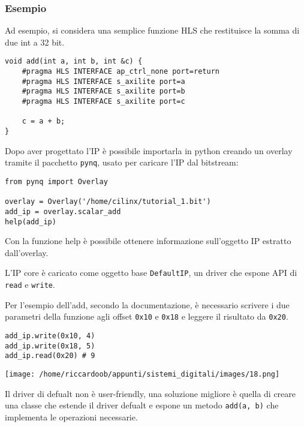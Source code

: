 \subsubsection{Esempio}
Ad esempio, si considera una semplice funzione HLS che restituisce la somma di due int a 32 bit.
\begin{verbatim}
void add(int a, int b, int &c) {
    #pragma HLS INTERFACE ap_ctrl_none port=return
    #pragma HLS INTERFACE s_axilite port=a
    #pragma HLS INTERFACE s_axilite port=b
    #pragma HLS INTERFACE s_axilite port=c

    c = a + b;
}
\end{verbatim}
Dopo aver progettato l'IP è possibile importarla in python creando un overlay tramite il pacchetto \texttt{pynq}, usato per caricare l'IP dal bitstream:
\begin{verbatim}
from pynq import Overlay

overlay = Overlay('/home/cilinx/tutorial_1.bit')
add_ip = overlay.scalar_add
help(add_ip)
\end{verbatim}
Con la funzione help è possibile ottenere informazione sull'oggetto IP estratto dall'overlay.

\begin{multicols}{2}
    L'IP core è caricato come oggetto base \texttt{DefaultIP}, un driver che espone API di \texttt{read} e \texttt{write}.
    
    Per l'esempio dell'add, secondo la documentazione, è necessario scrivere i due parametri della funzione agli offset \texttt{0x10} e \texttt{0x18} e leggere il risultato da \texttt{0x20}.
    \begin{verbatim}
add_ip.write(0x10, 4)
add_ip.write(0x18, 5)
add_ip.read(0x20) # 9
    \end{verbatim}
    \columnbreak
    \begin{multicolfigure}
        \centering
        \texttt{[image: /home/riccardoob/appunti/sistemi\_digitali/images/18.png]}
    \end{multicolfigure}
\end{multicols}

Il driver di defualt non è user-friendly, una soluzione migliore è quella di creare una classe che estende il driver defualt e espone un metodo \texttt{add(a, b)} che implementa le operazioni necessarie.

